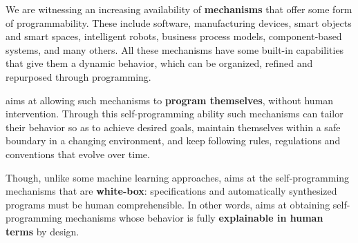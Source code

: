 



We are witnessing an increasing availability of \textbf{mechanisms} that offer
some form of programmability.
These include
software, %
manufacturing devices, %
smart objects and smart spaces, %
intelligent robots, %
business process models, %
component-based systems, %
and many others.
All these mechanisms have some built-in capabilities that give them a
dynamic behavior, which can be organized, refined and repurposed through
programming.

\project aims at allowing such mechanisms to \textbf{program
  themselves}, without human intervention.
Through this self-programming ability such mechanisms can tailor their
behavior so as to
achieve desired goals,  maintain themselves within a safe boundary in a
changing environment, and keep following rules,
regulations and conventions that evolve over time. 

Though, unlike some machine learning approaches, \project aims at the self-programming
mechanisms that are \textbf{white-box}:
specifications and automatically synthesized programs must be human
comprehensible. In other words, \project aims at obtaining self-programming
mechanisms whose behavior is fully \textbf{explainable in human terms}
by design.

